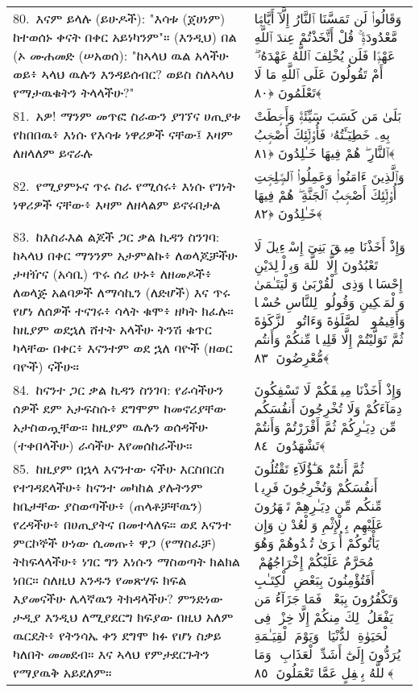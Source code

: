 \documentclass[11pt,a4paper,oneside]{article}%
\newcommand{\mytextarabic}[1]{\textarabic{ #1 \flushright}}
\begin{document}
\begin{longtable}{%
  @{}
    p{}
  @{~~~}
    p{}
    @{}
}
80.\ እናም ይላሉ (ይሁዶች): "እሳቱ (ጀሀነም) ከተወሰኑ ቀናት በቀር አይነካንም"። (እንዲህ) በል (ኦ ሙሐመድ (ሠአወሰ): "ከኣላህ ዉል አላችሁ ወይ፥ ኣላህ ዉሉን እንዳይሰብር? ወይስ ስለኣላህ የማታዉቁትን ትላላችሁ?" &  \mytextarabic{وَقَالُوا۟ لَن تَمَسَّنَا ٱلنَّارُ إِلَّآ أَيَّامًۭا مَّعْدُودَةًۭ ۚ قُلْ أَتَّخَذْتُمْ عِندَ ٱللَّهِ عَهْدًۭا فَلَن يُخْلِفَ ٱللَّهُ عَهْدَهُۥٓ ۖ أَمْ تَقُولُونَ عَلَى ٱللَّهِ مَا لَا تَعْلَمُونَ ﴿٨٠﴾}\\
81.\ አዎ! ማንም መጥፎ ስራውን ያገኘና ሀጢያቱ የከበበዉ፥ እነሱ የእሳቱ ነዋሪዎች ናቸው፤ እዛም ለዘላለም ይኖራሉ &  \mytextarabic{بَلَىٰ مَن كَسَبَ سَيِّئَةًۭ وَأَحَٟطَتْ بِهِۦ خَطِيٓـَٔتُهُۥ فَأُو۟لَٟٓئِكَ أَصْحَٟبُ ٱلنَّارِ ۖ هُمْ فِيهَا خَـٰلِدُونَ ﴿٨١﴾}\\
82.\ የሚያምኑና ጥሩ ስራ የሚሰሩ፥ እነሱ የገነት ነዋሪዎች ናቸው፥ እዛም ለዘላልም ይኖሩበታል &  \mytextarabic{وَٱلَّذِينَ ءَامَنُوا۟ وَعَمِلُوا۟ ٱلصَّٟلِحَٟتِ أُو۟لَٟٓئِكَ أَصْحَٟبُ ٱلْجَنَّةِ ۖ هُمْ فِيهَا خَـٰلِدُونَ ﴿٨٢﴾}\\
83.\ ከእስራእል ልጆች ጋር ቃል ኪዳን ስንገባ: ከኣላህ በቀር ማንንም አታምልኩ፥ ለወላጆቻችሁ ታዛዥና (አሳቢ) ጥሩ ሰሪ ሁኑ፥ ለዘመዶች፥ ለወላጅ አልባዎች ለማሳኪን (ለድሆች) እና ጥሩ የሆነ ለሰዎች ተናገሩ፥ ሳላት ቁሞ፥ ዘካት ክፈሉ። ከዚያም ወደኋለ ሸተት አላችሁ ትንሽ ቁጥር ካላቸው በቀር፥ እናንተም ወደ ኋለ ባዮች (ዘወር ባዮች) ናችሁ። &  \mytextarabic{وَإِذْ أَخَذْنَا مِيثَٟقَ بَنِىٓ إِسْرَٟٓءِيلَ لَا تَعْبُدُونَ إِلَّا ٱللَّهَ وَبِٱلْوَٟلِدَيْنِ إِحْسَانًۭا وَذِى ٱلْقُرْبَىٰ وَٱلْيَتَـٰمَىٰ وَٱلْمَسَٟكِينِ وَقُولُوا۟ لِلنَّاسِ حُسْنًۭا وَأَقِيمُوا۟ ٱلصَّلَوٰةَ وَءَاتُوا۟ ٱلزَّكَوٰةَ ثُمَّ تَوَلَّيْتُمْ إِلَّا قَلِيلًۭا مِّنكُمْ وَأَنتُم مُّعْرِضُونَ ﴿٨٣﴾}\\
84.\ ከናንተ ጋር ቃል ኪዳን ስንገባ: የራሳችሁን ሰዎች ደም አታፍስሱ፥ ደግሞም ከመኖሪያቸው አታስወጧቸው። ከዚያም ዉሉን ወሰዳችሁ (ተቀበላችሁ) ራሳችሁ እየመሰከራችሁ። &  \mytextarabic{وَإِذْ أَخَذْنَا مِيثَٟقَكُمْ لَا تَسْفِكُونَ دِمَآءَكُمْ وَلَا تُخْرِجُونَ أَنفُسَكُم مِّن دِيَـٰرِكُمْ ثُمَّ أَقْرَرْتُمْ وَأَنتُمْ تَشْهَدُونَ ﴿٨٤﴾}\\
85.\ ከዚያም በኋላ እናንተው ናችሁ እርስበርስ የተገዳደላችሁ፥ ከናንተ መካከል ያሉትንም ከቤታቸው ያስወጣችሁ፥ (ጠላቶቻቸዉን) የረዳችሁ፥ በሀጢያትና በመተላለፍ። ወደ እናንተ ምርኮኞች ሁነው ሲመጡ፥ ዋጋ (የማስፈቻ) ትከፍላላችሁ፥ ነገር ግን እነሱን ማስወጣት ክልክል ነበር። ስለዚህ አንዱን የመጽሃፍ ክፍል እያመናችሁ ሌላኛዉን ትክዳላችሁ? ምንድነው ታዲያ እንዲህ ለሚያደርግ ክፍያው በዚህ አለም ዉርዴት፥ የትንሳኤ ቀን ደግሞ ክፉ የሆነ ስቃይ ካለበት መመደብ። እና ኣላህ የምታደርጉትን የማያዉቅ አይደለም። &  \mytextarabic{ ثُمَّ أَنتُمْ هَـٰٓؤُلَآءِ تَقْتُلُونَ أَنفُسَكُمْ وَتُخْرِجُونَ فَرِيقًۭا مِّنكُم مِّن دِيَـٰرِهِمْ تَظَٟهَرُونَ عَلَيْهِم بِٱلْإِثْمِ وَٱلْعُدْوَٟنِ وَإِن يَأْتُوكُمْ أُسَٟرَىٰ تُفَٟدُوهُمْ وَهُوَ مُحَرَّمٌ عَلَيْكُمْ إِخْرَاجُهُمْ ۚ أَفَتُؤْمِنُونَ بِبَعْضِ ٱلْكِتَـٰبِ وَتَكْفُرُونَ بِبَعْضٍۢ ۚ فَمَا جَزَآءُ مَن يَفْعَلُ ذَٟلِكَ مِنكُمْ إِلَّا خِزْىٌۭ فِى ٱلْحَيَوٰةِ ٱلدُّنْيَا ۖ وَيَوْمَ ٱلْقِيَـٰمَةِ يُرَدُّونَ إِلَىٰٓ أَشَدِّ ٱلْعَذَابِ ۗ وَمَا ٱللَّهُ بِغَٟفِلٍ عَمَّا تَعْمَلُونَ ﴿٨٥﴾}\\

\end{longtable}
\end{document}
